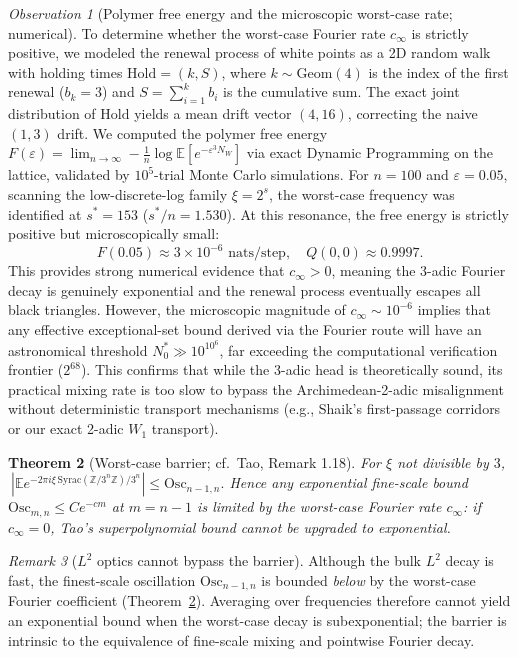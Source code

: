 \documentclass[12pt,a4paper]{article}
\newtheorem{theorem}{Theorem}[section]
\theoremstyle{remark}
\newtheorem{remark}[theorem]{Remark}
\newtheorem{observation}[theorem]{Observation}
\begin{document}
\begin{observation}[Polymer free energy and the microscopic worst-case rate; numerical]
\label{obs:polymer_free_energy}
To determine whether the worst-case Fourier rate $c_\infty$ is strictly positive, we modeled the renewal process of white points as a 2D random walk with holding times $\mathrm{Hold} = (k, S)$, where $k \sim \mathrm{Geom}(4)$ is the index of the first renewal ($b_k=3$) and $S = \sum_{i=1}^k b_i$ is the cumulative sum. The exact joint distribution of $\mathrm{Hold}$ yields a mean drift vector $(4, 16)$, correcting the naive $(1,3)$ drift.
We computed the polymer free energy $F(\varepsilon) = \lim_{n \to \infty} -\frac{1}{n} \log \mathbb{E}[e^{-\varepsilon^3 N_W}]$ via exact Dynamic Programming on the lattice, validated by $10^5$-trial Monte Carlo simulations. For $n=100$ and $\varepsilon=0.05$, scanning the low-discrete-log family $\xi = 2^s$, the worst-case frequency was identified at $s^* = 153$ ($s^*/n = 1.530$). At this resonance, the free energy is strictly positive but microscopically small:
\[
F(0.05) \approx 3 \times 10^{-6} \text{ nats/step}, \quad Q(0,0) \approx 0.9997.
\]
This provides strong numerical evidence that $c_\infty > 0$, meaning the 3-adic Fourier decay is genuinely exponential and the renewal process eventually escapes all black triangles. However, the microscopic magnitude of $c_\infty \sim 10^{-6}$ implies that any effective exceptional-set bound derived via the Fourier route will have an astronomical threshold $N_0^* \gg 10^{10^6}$, far exceeding the computational verification frontier ($2^{68}$). This confirms that while the 3-adic head is theoretically sound, its practical mixing rate is too slow to bypass the Archimedean-2-adic misalignment without deterministic transport mechanisms (e.g., Shaik's first-passage corridors or our exact 2-adic $W_1$ transport).
\end{observation}
\begin{theorem}[Worst-case barrier; cf.\ Tao, Remark 1.18]
\label{thm:barrier}
For $\xi$ not divisible by $3$,
$\ |\mathbb E e^{-2\pi i\xi\,\mathrm{Syrac}(\mathbb Z/3^n\mathbb Z)/3^n}|
\le\mathrm{Osc}_{n-1,n}.$
Hence any exponential fine-scale bound $\mathrm{Osc}_{m,n}\le Ce^{-cm}$ at
$m=n-1$ is limited by the worst-case Fourier rate $c_\infty$: if $c_\infty=0$,
Tao's superpolynomial bound cannot be upgraded to exponential.
\end{theorem}
\begin{remark}[$L^2$ optics cannot bypass the barrier]
Although the bulk $L^2$ decay is fast, the finest-scale oscillation
$\mathrm{Osc}_{n-1,n}$ is bounded \emph{below} by the worst-case Fourier
coefficient (Theorem~\ref{thm:barrier}). Averaging over frequencies therefore
cannot yield an exponential bound when the worst-case decay is subexponential;
the barrier is intrinsic to the equivalence of fine-scale mixing and pointwise
Fourier decay.
\end{remark}
\end{document}
